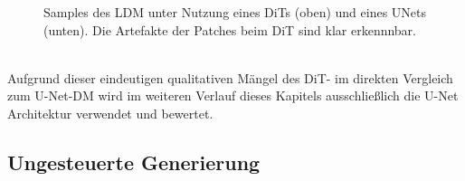\begin{figure}[htbp]
    \centering
    
    \vspace{-8pt}

    \caption{Samples des LDM unter Nutzung eines DiTs (oben) und eines UNets (unten). Die Artefakte der Patches beim DiT sind klar erkennnbar.}
    \label{fig:dit_unet_results}
\end{figure} \\
Aufgrund dieser eindeutigen qualitativen Mängel des DiT- im direkten Vergleich zum U-Net-DM wird im weiteren Verlauf dieses Kapitels ausschließlich die U-Net Architektur verwendet und bewertet. 


\subsection {Ungesteuerte Generierung}
\label{subsec:unconditional_results}

